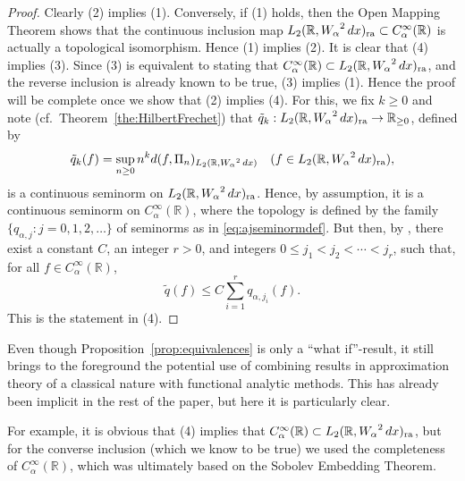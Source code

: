 \documentclass[12pt, reqno]{amsart}
\numberwithin{equation}{section}
\theoremstyle{plain}
\theoremstyle{definition}
\begin{document}
\begin{proof}
Clearly (2) implies (1). Conversely, if (1) holds, then the Open Mapping Theorem shows that the continuous inclusion map ${L_2({{\mathbb R}},{W_\alpha}^2\,dx)_{\textup{ra}}}\subset{{C_\alpha^\infty({{\mathbb R}})}}$ is actually a topological isomorphism. Hence (1) implies (2). It is clear that (4) implies (3). Since (3) is equivalent to stating that ${{C_\alpha^\infty({{\mathbb R}})}}\subset{L_2({{\mathbb R}},{W_\alpha}^2\,dx)_{\textup{ra}}}$, and the reverse inclusion is already known to be true, (3) implies (1). Hence the proof will be complete once we show that (2) implies (4). For this, we fix $k\geq 0$ and note (cf.~Theorem~\ref{the:HilbertFrechet}) that $\tilde q_k:{L_2({{\mathbb R}},{W_\alpha}^2\,dx)_{\textup{ra}}}\to{{\mathbb R}}_{\geq 0}$, defined by
\begin{equation*}
\tilde q_k(f)=\sup_{n\geq 0} n^k d(f,\Pi_n)_{{L_2({{\mathbb R}}, {W_\alpha}^2\,dx)}}\quad(f\in{L_2({{\mathbb R}},{W_\alpha}^2\,dx)_{\textup{ra}}}),
\end{equation*}
is a continuous seminorm on ${L_2({{\mathbb R}},{W_\alpha}^2\,dx)_{\textup{ra}}}$. Hence, by assumption, it is a continuous seminorm on ${{C_\alpha^\infty({{\mathbb R}})}}$, where the topology is defined by the family $\{{q_{\alpha, j}} : j=0,1,2,\ldots\}$ of seminorms as in \eqref{eq:ajseminormdef}.  But then, by \cite[Proposition~1.2.8]{KaRi}, there exist a constant $C$, an integer $r>0$, and integers $0\leq j_1<j_2<\cdots<j_r$, such that, for all $f\in{{C_\alpha^\infty({{\mathbb R}})}}$,
\begin{equation*}
 \tilde q(f)\leq C \sum_{i=1}^r q_{\alpha,j_i}(f).
\end{equation*}
This is the statement in (4).
\end{proof}

Even though Proposition~\ref{prop:equivalences} is only a ``what if''-result, it still brings to the foreground the potential use of combining results in approximation theory of a classical nature with functional analytic methods. This has already been implicit in the rest of the paper, but here it is particularly clear.

For example, it is obvious that (4) implies that ${{C_\alpha^\infty({{\mathbb R}})}}\subset{L_2({{\mathbb R}},{W_\alpha}^2\,dx)_{\textup{ra}}}$, but for the converse inclusion (which we know to be true) we used the completeness of ${{C_\alpha^\infty({{\mathbb R}})}}$, which was ultimately based on the Sobolev Embedding Theorem.
\end{document}
